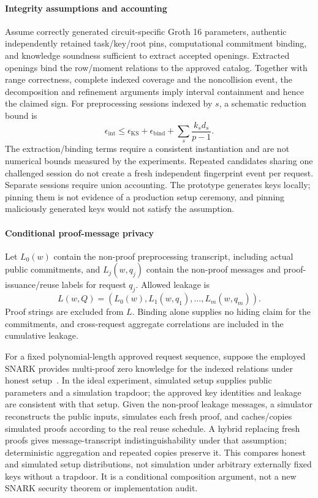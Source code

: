 \documentclass[5p,times,twocolumn]{elsarticle}
\begin{document}
\paragraph{Integrity assumptions and accounting}
Assume correctly generated circuit-specific Groth 16 parameters, authentic
independently retained task/key/root pins, computational commitment
binding, and knowledge soundness sufficient to extract accepted openings.
Extracted openings bind the row/moment relations to the approved catalog.
Together with range correctness, complete indexed coverage and the
noncollision event, the decomposition and refinement arguments imply
interval containment and hence the claimed sign. For preprocessing
sessions indexed by $s$, a schematic reduction bound is
\begin{equation}
 \epsilon_{\mathrm{int}}\leq
 \epsilon_{\mathrm{KS}}+\epsilon_{\mathrm{bind}}
 +\sum_s\frac{k_s d_s}{p-1}.
\end{equation}
The extraction/binding terms require a consistent instantiation and are
not numerical bounds measured by the experiments. Repeated candidates
sharing one challenged session do not create a fresh independent
fingerprint event per request. Separate sessions require union accounting.
The prototype generates keys locally; pinning them is not evidence of a
production setup ceremony, and pinning maliciously generated keys would
not satisfy the assumption.

\paragraph{Conditional proof-message privacy}
Let $L_0(w)$ contain the non-proof preprocessing transcript, including
actual public commitments, and $L_j(w,q_j)$ contain the non-proof messages
and proof-issuance/reuse labels for request $q_j$. Allowed leakage is
\begin{equation}
 L(w,Q)=(L_0(w),L_1(w,q_1),\ldots,L_m(w,q_m)).
\end{equation}
Proof strings are excluded from $L$. Binding alone supplies no hiding
claim for the commitments, and cross-request aggregate correlations are
included in the cumulative leakage.

For a fixed polynomial-length approved request sequence, suppose the
employed SNARK provides multi-proof zero knowledge for the indexed
relations under honest setup~\cite{groth2016}. In the ideal experiment,
simulated setup supplies public parameters and a simulation trapdoor;
the approved key identities and leakage are consistent with that setup.
Given the non-proof leakage messages, a simulator reconstructs the public
inputs, simulates each fresh proof, and caches/copies simulated proofs
according to the real reuse schedule. A hybrid replacing fresh proofs
gives message-transcript indistinguishability under that assumption;
deterministic aggregation and repeated copies preserve it. This compares
honest and simulated setup distributions, not simulation under arbitrary
externally fixed keys without a trapdoor. It is a conditional composition
argument, not a new SNARK security theorem or implementation audit.
\end{document}
